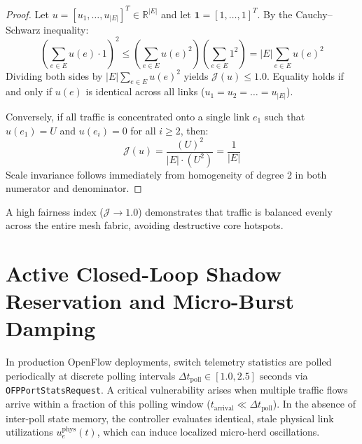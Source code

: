 \begin{proof}
Let $u = [u_1, \dots, u_{|E|}]^T \in \mathbb{R}^{|E|}$ and let $\mathbf{1} = [1, \dots, 1]^T$. By the Cauchy--Schwarz inequality:
\begin{equation}
    \left( \sum_{e \in E} u(e) \cdot 1 \right)^2 \le \left( \sum_{e \in E} u(e)^2 \right) \left( \sum_{e \in E} 1^2 \right) = |E| \sum_{e \in E} u(e)^2
\end{equation}
Dividing both sides by $|E| \sum_{e \in E} u(e)^2$ yields $\mathcal{J}(u) \le 1.0$. Equality holds if and only if $u(e)$ is identical across all links ($u_1 = u_2 = \dots = u_{|E|}$).

Conversely, if all traffic is concentrated onto a single link $e_1$ such that $u(e_1) = U$ and $u(e_i) = 0$ for all $i \ge 2$, then:
\begin{equation}
    \mathcal{J}(u) = \frac{(U)^2}{|E| \cdot (U^2)} = \frac{1}{|E|}
\end{equation}
Scale invariance follows immediately from homogeneity of degree 2 in both numerator and denominator.
\end{proof}

A high fairness index ($\mathcal{J} \to 1.0$) demonstrates that traffic is balanced evenly across the entire mesh fabric, avoiding destructive core hotspots.

\section{Active Closed-Loop Shadow Reservation and Micro-Burst Damping}
\label{sec:shadow_reservation_math}
In production OpenFlow deployments, switch telemetry statistics are polled periodically at discrete polling intervals $\Delta t_{\text{poll}} \in [1.0, 2.5]\text{ seconds}$ via \texttt{OFPPortStatsRequest}. A critical vulnerability arises when multiple traffic flows arrive within a fraction of this polling window ($t_{\text{arrival}} \ll \Delta t_{\text{poll}}$). In the absence of inter-poll state memory, the controller evaluates identical, stale physical link utilizations $u_e^{\text{phys}}(t)$, which can induce localized micro-herd oscillations.

